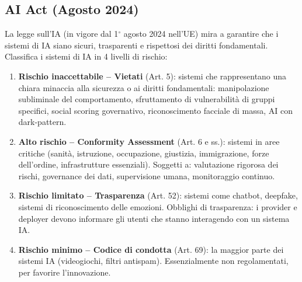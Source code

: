 \documentclass[a4paper,11pt]{article}
\begin{document}
\subsection{AI Act (Agosto 2024)}

\begin{definizione}[AI Act]
La legge sull'IA (in vigore dal 1$^{\circ}$ agosto 2024 nell'UE) mira a garantire che i sistemi di IA siano sicuri, trasparenti e rispettosi dei diritti fondamentali. Classifica i sistemi di IA in 4 livelli di rischio:
\begin{enumerate}
  \item \textbf{Rischio inaccettabile -- Vietati} (Art. 5): sistemi che rappresentano una chiara minaccia alla sicurezza o ai diritti fondamentali: manipolazione subliminale del comportamento, sfruttamento di vulnerabilit\`{a} di gruppi specifici, social scoring governativo, riconoscimento facciale di massa, AI con dark-pattern.
  \item \textbf{Alto rischio -- Conformity Assessment} (Art. 6 e ss.): sistemi in aree critiche (sanit\`{a}, istruzione, occupazione, giustizia, immigrazione, forze dell'ordine, infrastrutture essenziali). Soggetti a: valutazione rigorosa dei rischi, governance dei dati, supervisione umana, monitoraggio continuo.
  \item \textbf{Rischio limitato -- Trasparenza} (Art. 52): sistemi come chatbot, deepfake, sistemi di riconoscimento delle emozioni. Obblighi di trasparenza: i provider e deployer devono informare gli utenti che stanno interagendo con un sistema IA.
  \item \textbf{Rischio minimo -- Codice di condotta} (Art. 69): la maggior parte dei sistemi IA (videogiochi, filtri antispam). Essenzialmente non regolamentati, per favorire l'innovazione.
\end{enumerate}
\end{definizione}
\end{document}
